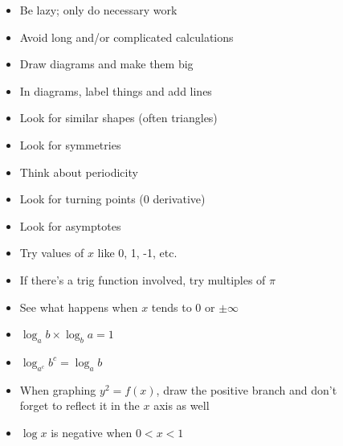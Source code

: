 \documentclass[../main.tex]{subfile}
\begin{document}

\begin{figure}[h]
\centering
\begin{minipage}{0.85\linewidth}

\begin{itemize}
	\item Be lazy; only do necessary work
	\item Avoid long and/or complicated calculations
	\item Draw diagrams and make them big
	\item In diagrams, label things and add lines
	\item Look for similar shapes (often triangles)
\end{itemize}


\begin{itemize}
	\item Look for symmetries
	\item Think about periodicity
	\item Look for turning points (0 derivative)
	\item Look for asymptotes
	\item Try values of $x$ like 0, 1, -1, etc.
	\item If there's a trig function involved, try multiples of $\pi$
	\item See what happens when $x$ tends to 0 or $\pm \infty$
\end{itemize}


\begin{itemize}
	\item $\log_a b \times \log_b a = 1$
	\item $\log_{a^c} b^c = \log_a b$
	\item When graphing $y^2 = f(x)$, draw the positive branch and don't forget to reflect it in the $x$ axis as well
	\item $\log x$ is negative when $0 < x < 1$
\end{itemize}
\end{minipage}
\end{figure}
\end{document}
